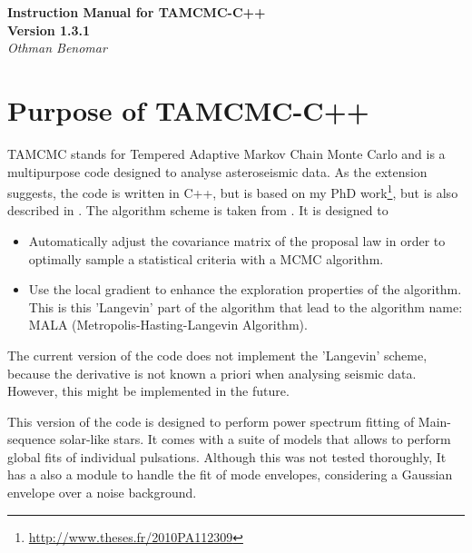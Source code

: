 \documentclass[10pt,a4paper]{article}
\begin{document}
\begin{titlepage}
   \begin{center}
      \Large\textbf{Instruction Manual for TAMCMC-C++}\\
      \textbf{Version 1.3.1} \\
      \large\textit{Othman Benomar}
   \end{center}
\end{titlepage}

\tableofcontents
\newpage
{}


\section{Purpose of TAMCMC-C++}

	TAMCMC stands for Tempered Adaptive Markov Chain Monte Carlo and is a multipurpose code designed to analyse asteroseismic data. As the extension suggests, the code is written in C++, but is based on my PhD work\footnote{\url{http://www.theses.fr/2010PA112309}}, but is also described in \cite{Benomar2009}. The algorithm scheme is taken from \cite{atchade2006}. It is designed to
	\begin{itemize}
		\item Automatically adjust the covariance matrix of the proposal law in order to optimally sample a statistical criteria with a MCMC algorithm.
		\item Use the local gradient to enhance the exploration properties of the algorithm. This is this 'Langevin' part of the algorithm that lead to the algorithm name: MALA (Metropolis-Hasting-Langevin Algorithm).   
	\end{itemize}
The current version of the code does not implement the 'Langevin' scheme, because the derivative is not known a priori when analysing seismic data. However, this might be implemented in the future.

This version of the code is designed to perform power spectrum fitting of Main-sequence solar-like stars. It comes with a suite of models that allows to perform global fits of individual pulsations. Although this was not tested thoroughly, It has a also a module to handle the fit of mode envelopes, considering a Gaussian envelope over a noise background. 
\end{document}
